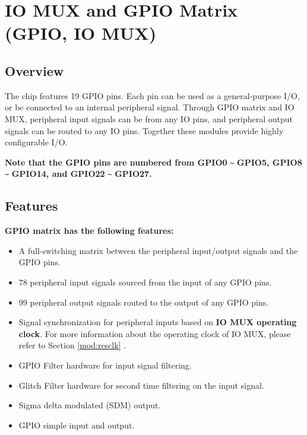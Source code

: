 \documentclass[main\_\_EN.tex]{subfiles}
\begin{document}

\ifglobal
\else
    {\let\clearpage\relax \listoftodos}
    {\let\clearpage\relax \listofdonetodos}
    \tableofcontents
    \listoftables
    \listoffigures
\fi










\hypertarget{iomuxgpio}{}
\chapter{IO MUX and GPIO Matrix (GPIO, IO MUX)}
\label{mod:iomuxgpio}

\section{Overview}

The \chipname{} chip features 19 GPIO pins. Each pin can be used as a general-purpose I/O, or be connected to an internal peripheral signal. Through GPIO matrix and IO MUX, peripheral input signals can be from any IO pins, and peripheral output signals can be routed to any IO pins. Together these modules provide highly configurable I/O.

\textbf{Note that the GPIO pins are numbered from GPIO0} \verb+~+ \textbf{GPIO5, GPIO8} \verb+~+ \textbf{GPIO14, and GPIO22} \verb+~+ \textbf{GPIO27.}


\section{Features}

\textbf{GPIO matrix has the following features:}

\begin{itemize}
\item A full-switching matrix between the peripheral input/output signals and the GPIO pins.
\item 78 peripheral input signals sourced from the input of any GPIO pins.
\item 99 peripheral output signals routed to the output of any GPIO pins.

\item Signal synchronization for peripheral inputs based on \textbf{IO MUX operating clock}. For more information about the operating clock of IO MUX, please refer to Section \ref{mod:resclk} \textit{}.

\item GPIO Filter hardware for input signal filtering.
\item Glitch Filter hardware for second time filtering on the input signal.
\item Sigma delta modulated (SDM) output.
\item GPIO simple input and output.
\end{itemize}
\end{document}
